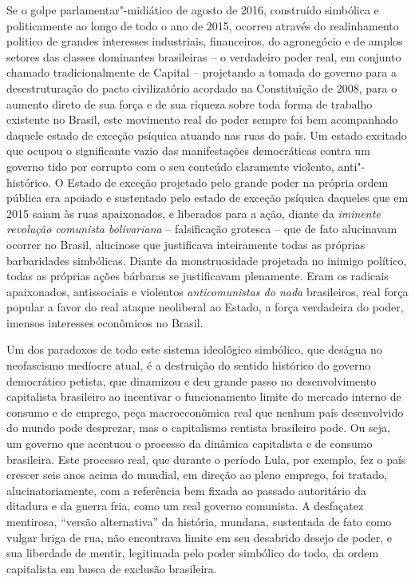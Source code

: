 Se o golpe parlamentar"-midiático de agosto de 2016, construído simbólica
e politicamente ao longo de todo o ano de 2015, ocorreu através do
realinhamento politico de grandes interesses industriais, financeiros,
do agronegócio e de amplos setores das classes dominantes brasileiras --
o verdadeiro poder real, em conjunto chamado tradicionalmente de Capital
-- projetando a tomada do governo para a desestruturação do pacto
civilizatório acordado na Constituição de 2008, para o aumento direto de
sua força e de sua riqueza sobre toda forma de trabalho existente no
Brasil, este movimento real do poder sempre foi bem acompanhado daquele
estado de exceção psíquica atuando nas ruas do país. Um estado excitado
que ocupou o significante vazio das manifestações democráticas contra um
governo tido por corrupto com o seu conteúdo claramente violento,
anti"-histórico. O Estado de exceção projetado pelo grande poder na
própria ordem pública era apoiado e sustentado pelo estado de exceção
psíquica daqueles que em 2015 saiam às ruas apaixonados, e liberados
para a ação, diante da \emph{iminente revolução comunista bolivariana}
-- falsificação grotesca -- que de fato alucinavam ocorrer no Brasil,
alucinose que justificava inteiramente todas as próprias barbaridades
simbólicas. Diante da monstruosidade projetada no inimigo político,
todas as próprias ações bárbaras se justificavam plenamente. Eram os
radicais apaixonados, antissociais e violentos \emph{anticomunistas do
nada} brasileiros, real força popular a favor do real ataque neoliberal
ao Estado, a força verdadeira do poder, imensos interesses econômicos no
Brasil.

Um dos paradoxos de todo este sistema ideológico simbólico, que deságua
no neofascismo medíocre atual, é a destruição do sentido histórico do
governo democrático petista, que dinamizou e deu grande passo no
desenvolvimento capitalista brasileiro ao incentivar o funcionamento
limite do mercado interno de consumo e de emprego, peça macroeconômica
real que nenhum país desenvolvido do mundo pode desprezar, mas o
capitalismo rentista brasileiro pode. Ou seja, um governo que acentuou o
processo da dinâmica capitalista e de consumo brasileira. Este processo
real, que durante o período Lula, por exemplo, fez o país crescer seis
anos acima do  mundial, em direção ao pleno emprego, foi tratado,
alucinatoriamente, com a referência bem fixada ao passado autoritário da
ditadura e da guerra fria, como um real governo comunista. A desfaçatez
mentirosa, ``versão alternativa'' da história, mundana, sustentada de
fato como vulgar briga de rua, não encontrava limite em seu desabrido
desejo de poder, e sua liberdade de mentir, legitimada pelo poder
simbólico do todo, da ordem capitalista em busca de exclusão brasileira.

